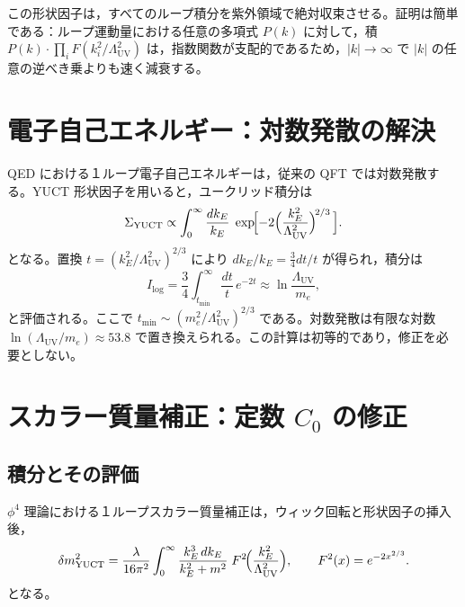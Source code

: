 \documentclass[11pt,a4paper]{article}
\newcommand{\LUV}{\Lambda_{\mathrm{UV}}}
\theoremstyle{remark}
\begin{document}
	この形状因子は，すべてのループ積分を紫外領域で絶対収束させる。証明は簡単である：ループ運動量における任意の多項式 \(P(k)\) に対して，積 \(P(k) \cdot \prod_i F(k_i^2/\LUV^2)\) は，指数関数が支配的であるため，\(|k| \to \infty\) で \(|k|\) の任意の逆べき乗よりも速く減衰する。
	
	\section{電子自己エネルギー：対数発散の解決}
	\label{sec:electron}
	
	QED における１ループ電子自己エネルギーは，従来の QFT では対数発散する。YUCT 形状因子を用いると，ユークリッド積分は
	\begin{equation}
		\Sigma_{\mathrm{YUCT}} \propto \int_0^{\infty} \frac{dk_E}{k_E}\; \exp\!\Bigl[-2\Bigl(\frac{k_E^2}{\LUV^2}\Bigr)^{\!2/3}\,\Bigr].
		\label{eq:elec_int}
	\end{equation}
	となる。置換 \(t = (k_E^2/\LUV^2)^{2/3}\) により \(dk_E/k_E = \frac{3}{4} dt/t\) が得られ，積分は
	\begin{equation}
		I_{\mathrm{log}} = \frac{3}{4} \int_{t_{\min}}^{\infty} \frac{dt}{t}\, e^{-2t} \approx \ln\frac{\LUV}{m_e},
		\label{eq:elec_result}
	\end{equation}
	と評価される。ここで \(t_{\min} \sim (m_e^2/\LUV^2)^{2/3}\) である。対数発散は有限な対数 \(\ln(\LUV/m_e) \approx 53.8\) で置き換えられる。この計算は初等的であり，修正を必要としない。
	
	\section{スカラー質量補正：定数 \(C_0\) の修正}
	\label{sec:scalar}
	
	\subsection{積分とその評価}
	
	\(\phi^4\) 理論における１ループスカラー質量補正は，ウィック回転と形状因子の挿入後，
	\begin{equation}
		\delta m^2_{\mathrm{YUCT}} = \frac{\lambda}{16\pi^2} \int_0^{\infty} \frac{k_E^3\, dk_E}{k_E^2 + m^2}\; F^2\!\Bigl(\frac{k_E^2}{\LUV^2}\Bigr), \qquad F^2(x) = e^{-2x^{2/3}}.
		\label{eq:scalar_YUCT}
	\end{equation}
	となる。
	
\end{document}
